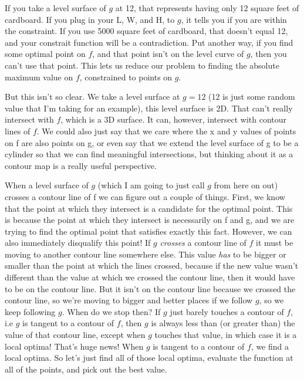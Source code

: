 \documentclass[12pt, letterpaper]{article}
\begin{document}
If you take a level surface of $g$ at 12, that represents having only 12 square feet of cardboard.
If you plug in your L, W, and H, to $g$, it tells you if you are within the constraint.
If you use 5000 square feet of cardboard, that doesn't equal 12, and your constrait function will be a contradiction. 
Put another way, if you find some optimal point on $f$, and that point isn't on the level curve of $g$, then you can't use that point.
This lets us reduce our problem to finding the absolute maximum value on $f$, constrained to points on $g$.

But this isn't so clear. We take a level surface at $g = 12$ (12 is just some random value that I'm taking for an example),
this level surface is 2D. That can't really intersect with $f$, which is a 3D surface.
It can, however, intersect with contour lines of $f$.
We could also just say that we care where the x and y values of points on f are also points on g,
or even say that we extend the level surface of g to be a cylinder so that we can find meaningful intersections,
but thinking about it as a contour map is a really useful perspective. 

When a level surface of $g$ (which I am going to just call $g$ from here on out) crosses a contour line of f we can figure out a couple of things.
First, we know that the point at which they intersect is a candidate for the optimal point.
This is because the point at which they intersect is necessarily on f and g, and we are trying to find the optimal point that satisfies exactly this fact.
However, we can also immediately disqualify this point!
If $g$ \emph{crosses} a contour line of $f$ it must be moving to another contour line somewhere else.
This value \emph{has} to be bigger or smaller than the point at which the lines crossed, because if the new value wasn't different than the value at which we crossed the contour line, then it would have to be on the contour line.
But it isn't on the contour line because we crossed the contour line, so we're moving to bigger and better places if we follow $g$, so we keep following $g$.
When do we stop then? If $g$ just barely touches a contour of $f$, i.e $g$ is tangent to a contour of $f$, then $g$ is always less than (or greater than) the value of that contour line, except when $g$ touches that value, in which case it is a local optima!
That's huge news! When $g$ is tangent to a contour of $f$, we find a local optima. So let's just find all of those local optima, evaluate the function at all of the points, and pick out the best value.
\end{document}
